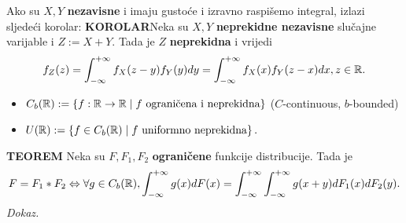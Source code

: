 \documentclass{article}
\begin{document}
Ako su \(X,Y\) \textbf{nezavisne} i imaju gustoće i izravno raspišemo integral, izlazi sljedeći korolar:\newline\newline
\textbf{KOROLAR}\newline Neka su \(X,Y\) \textbf{neprekidne nezavisne} slučajne varijable i \(Z:=X+Y.\) Tada je \(Z\) \textbf{neprekidna} i vrijedi \[f_Z(z)=\int_{-\infty}^{+\infty}f_X(z-y)f_Y(y)dy=\int_{-\infty}^{+\infty}f_X(x)f_Y(z-x)dx,z\in\Bbb R.\] 
\begin{itemize}
    \item[] \(C_b(\Bbb R):=\left\{f:\Bbb R\to\Bbb R\mid f\text{ ograničena i neprekidna}\right\}\) (\(C\)-continuous, \(b\)-bounded)
    \item[] \(U(\Bbb R):=\left\{f\in C_b(\Bbb R)\mid f\text{ uniformno neprekidna}\right\}.\)
\end{itemize}
\textbf{TEOREM}\newline
Neka su \(F,F_1,F_2\) \textbf{ograničene} funkcije distribucije. Tada je \[F=F_1*F_2\Leftrightarrow\forall g\in C_b(\Bbb R),\int_{-\infty}^{+\infty}g(x)dF(x)=\int_{-\infty}^{+\infty}\int_{-\infty}^{+\infty}g(x+y)dF_1(x)dF_2(y).\] 
\textit{Dokaz.}\newline
\end{document}
